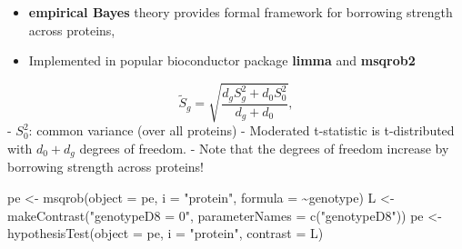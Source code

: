 \documentclass[
]{article}
\newenvironment{Shaded}{\begin{snugshade}}{\end{snugshade}}
\newcommand{\AttributeTok}[1]{\textcolor[rgb]{0.77,0.63,0.00}{#1}}
\newcommand{\FloatTok}[1]{\textcolor[rgb]{0.00,0.00,0.81}{#1}}
\newcommand{\FunctionTok}[1]{\textcolor[rgb]{0.00,0.00,0.00}{#1}}
\newcommand{\NormalTok}[1]{#1}
\newcommand{\OtherTok}[1]{\textcolor[rgb]{0.56,0.35,0.01}{#1}}
\newcommand{\SpecialCharTok}[1]{\textcolor[rgb]{0.00,0.00,0.00}{#1}}
\newcommand{\StringTok}[1]{\textcolor[rgb]{0.31,0.60,0.02}{#1}}
\providecommand{\tightlist}{%
  \setlength{\itemsep}{0pt}\setlength{\parskip}{0pt}}
\begin{document}
\begin{itemize}
\tightlist
\item
  \textbf{empirical Bayes} theory provides formal framework for
  borrowing strength across proteins,
\item
  Implemented in popular bioconductor package \textbf{limma} and
  \textbf{msqrob2}
\end{itemize}

\[
  \tilde{S}_g=\sqrt{\frac{d_gS_g^2+d_0S_0^2}{d_g+d_0}},
\] - \(S_0^2\): common variance (over all proteins) - Moderated
t-statistic is t-distributed with \(d_0+d_g\) degrees of freedom. - Note
that the degrees of freedom increase by borrowing strength across
proteins!

\begin{Shaded}
\begin{Highlighting}[]
\NormalTok{pe }\OtherTok{\textless{}{-}} \FunctionTok{msqrob}\NormalTok{(}\AttributeTok{object =}\NormalTok{ pe, }\AttributeTok{i =} \StringTok{"protein"}\NormalTok{, }\AttributeTok{formula =} \SpecialCharTok{\textasciitilde{}}\NormalTok{genotype)}
\NormalTok{L }\OtherTok{\textless{}{-}} \FunctionTok{makeContrast}\NormalTok{(}\StringTok{"genotypeD8 = 0"}\NormalTok{, }\AttributeTok{parameterNames =} \FunctionTok{c}\NormalTok{(}\StringTok{"genotypeD8"}\NormalTok{))}
\NormalTok{pe }\OtherTok{\textless{}{-}} \FunctionTok{hypothesisTest}\NormalTok{(}\AttributeTok{object =}\NormalTok{ pe, }\AttributeTok{i =} \StringTok{"protein"}\NormalTok{, }\AttributeTok{contrast =}\NormalTok{ L)}
\end{Highlighting}
\end{Shaded}

\begin{Shaded}
\end{Shaded}
\end{document}
